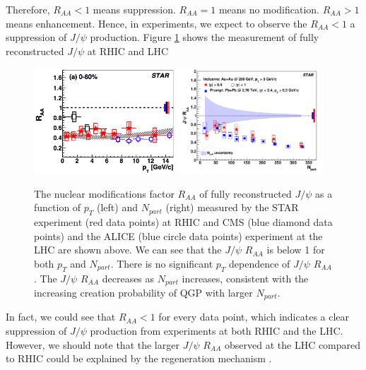 Therefore, $R_{AA} < 1$ means suppression. $R_{AA} =1$ means no modification. $R_{AA} > 1$ means enhancement. Hence, in experiments, we expect to observe the $R_{AA} < 1$ a suppression of $J/\psi$ production. Figure \ref{JPsiSupp} shows the measurement of fully reconstructed $J/\psi$ at RHIC and LHC \cite{STARJpsi}


\begin{figure}[hbtp]
\begin{center}
\includegraphics[width=0.47\textwidth]{Figures/Chapter1/STARPt.png}
\includegraphics[width=0.487\textwidth]{Figures/Chapter1/STARNPart.png}
\caption{The nuclear modifications factor $R_{AA}$ of fully reconstructed $J/\psi$ as a function of $p_{T}$ (left) and $N_{part}$ (right) measured by the STAR experiment (red data points) at RHIC and CMS (blue diamond data points) and the ALICE (blue circle data points) experiment at the LHC are shown above. We can see that the $J/\psi$ $R_{AA}$ is below 1 for both $p_T$ and $N_{part}$. There is no significant $p_T$ dependence of $J/\psi$ $R_{AA}$. The $J/\psi$ $R_{AA}$ decreases as $N_{part}$ increases, consistent with the increasing creation probability of QGP with larger $N_{part}$.}
\label{JPsiSupp}
\end{center}
\end{figure} 

In fact, we could see that $R_{AA} < 1$ for every data point, which indicates a clear suppression of $J/\psi$ production from experiments at both RHIC and the LHC. However, we should note that the larger $J/\psi$ $R_{AA}$ observed at the LHC compared to RHIC could be explained by the regeneration mechanism \cite{JPsiRegen}. %

